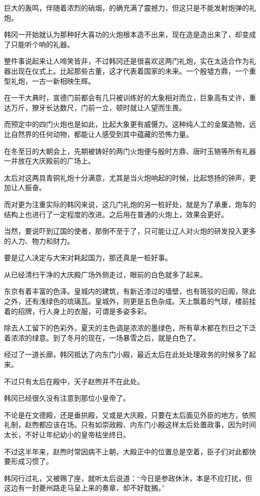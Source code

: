 巨大的轰鸣，伴随着浓烈的硝烟，的确充满了震撼力，但这只是不能发射炮弹的礼炮。

韩冈一开始就认为那种好大喜功的火炮根本造不出来，现在造是造出来了，却变成了只能听个响的礼器。

整件事说起来让人啼笑皆非，不过韩冈还是很喜欢这两门礼炮，实在太适合作为礼器出现在仪式上。比起那些古董，这才代表着国家的未来。一个殷墟方鼎，一个重型礼炮，一古一新相映生辉。

在一干大典时，宣德门前都会有几只被训练好的大象相对而立，巨象高有丈许，重达万斤，獠牙长达数尺，门前一立，顿时就让人望而生畏。

而预定中的四门火炮也是如此，比起大象更有威慑力。这种纯人工的金属造物，远比自然界的任何动物，都能让人感受到其中蕴藏的恐怖力量。

在冬至日的大朝会上，先期被铸好的两门火炮便与殷时方鼎、唐时玉辂等所有礼器一并放在大庆殿前的广场上。

太后对这两具青铜礼炮十分满意，尤其是当火炮响起的时候，比起悠扬的钟声，更加让人振奋。

而对更为注重实际的韩冈来说，这几门礼炮的另一桩好处，就是为了承重，炮车的结构上也进行了一定程度的改进。之后用在普通的火炮上，效果会更好。

当然，要说吓到辽国的使者，那倒不至于了，只可能让辽人对火炮的研发投入更多的人力、物力和财力。

要是辽人决定与大宋对耗起国力，那还真是一桩好事。

从已经清扫干净的大庆殿广场外侧走过，眼前的白色就多了起来。

东京有着丰富的色泽。皇城内的建筑，有新近漆过的墙壁，也有斑驳的旧阁，除此之外，还有浅绿色的琉璃瓦。皇城外，则更是五色杂成。天上飘着的气球，楼前挂着的招牌，行人身上的衣服，可谓是多姿多彩。

除去人工留下的色彩外，夏天的主色调是浓浓的墨绿色，所有草木都在烈日之下泛着浓浓的绿意。到了冬月的现在，一场暴雪之后，就是白色了。

经过了一道长廊，韩冈抵达了内东门小殿，最近太后在此处处理政务的时候多了起来。

不过只有太后在殿中，天子赵煦并不在此处。

韩冈已经很久没有注意到那位小皇帝了。

不论是在文德殿，还是垂拱殿，又或是大庆殿，只要在太后面见外臣的地方，依照礼制，赵煦都应该在场。只有如崇政殿、内东门小殿这样太后处置政事，因为时间太长，不好让年纪幼小的皇帝枯坐终日。

不过这半年来，赵煦时常因病不上朝，大殿正中的位置总是空着，臣子们对此都快要形成习惯了。

韩冈行过礼，又被赐了座，就听太后说道：“今日是参政休沐，本是不应打扰，但这边有一封夔州路走马呈上来的奏章，却不好耽搁。”

